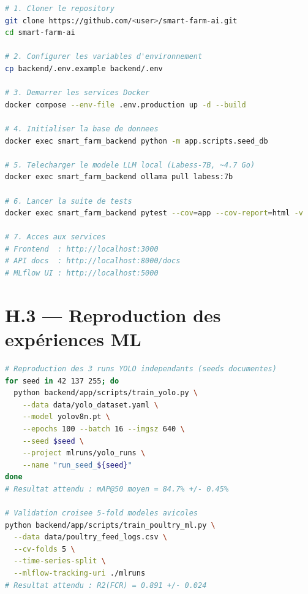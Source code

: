 \begin{lstlisting}[language=bash,
  caption={Script de démarrage complet},
  label={lst:setup}]
# 1. Cloner le repository
git clone https://github.com/<user>/smart-farm-ai.git
cd smart-farm-ai

# 2. Configurer les variables d'environnement
cp backend/.env.example backend/.env

# 3. Demarrer les services Docker
docker compose --env-file .env.production up -d --build

# 4. Initialiser la base de donnees
docker exec smart_farm_backend python -m app.scripts.seed_db

# 5. Telecharger le modele LLM local (Labess-7B, ~4.7 Go)
docker exec smart_farm_backend ollama pull labess:7b

# 6. Lancer la suite de tests
docker exec smart_farm_backend pytest --cov=app --cov-report=html -v

# 7. Acces aux services
# Frontend  : http://localhost:3000
# API docs  : http://localhost:8000/docs
# MLflow UI : http://localhost:5000
\end{lstlisting}

\section*{H.3 — Reproduction des expériences ML}

\begin{lstlisting}[language=bash,
  caption={Reproduction des entraînements YOLO et ML avicoles},
  label={lst:ml_repro}]
# Reproduction des 3 runs YOLO independants (seeds documentes)
for seed in 42 137 255; do
  python backend/app/scripts/train_yolo.py \
    --data data/yolo_dataset.yaml \
    --model yolov8n.pt \
    --epochs 100 --batch 16 --imgsz 640 \
    --seed $seed \
    --project mlruns/yolo_runs \
    --name "run_seed_${seed}"
done
# Resultat attendu : mAP@50 moyen = 84.7% +/- 0.45%

# Validation croisee 5-fold modeles avicoles
python backend/app/scripts/train_poultry_ml.py \
  --data data/poultry_feed_logs.csv \
  --cv-folds 5 \
  --time-series-split \
  --mlflow-tracking-uri ./mlruns
# Resultat attendu : R2(FCR) = 0.891 +/- 0.024
\end{lstlisting}

\printbibliography[heading=bibintoc, title={Références Bibliographiques}]


